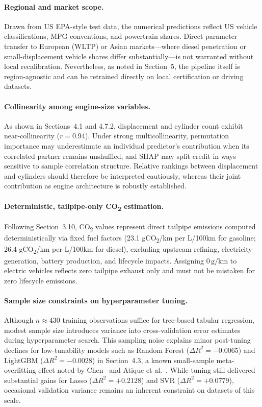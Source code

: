 \paragraph{Regional and market scope.}
Drawn from US EPA-style test data, the numerical predictions reflect US vehicle classifications, MPG conventions, and powertrain shares. Direct parameter transfer to European (WLTP) or Asian markets---where diesel penetration or small-displacement vehicle shares differ substantially---is not warranted without local recalibration. Nevertheless, as noted in Section~5, the pipeline itself is region-agnostic and can be retrained directly on local certification or driving datasets.

\paragraph{Collinearity among engine-size variables.}
As shown in Sections~4.1 and 4.7.2, displacement and cylinder count exhibit near-collinearity (\(r = 0.94\)). Under strong multicollinearity, permutation importance may underestimate an individual predictor's contribution when its correlated partner remains unshuffled, and SHAP may split credit in ways sensitive to sample correlation structure. Relative rankings between displacement and cylinders should therefore be interpreted cautiously, whereas their joint contribution as engine architecture is robustly established.

\paragraph{Deterministic, tailpipe-only CO\textsubscript{2} estimation.}
Following Section~3.10, CO\textsubscript{2} values represent direct tailpipe emissions computed deterministically via fixed fuel factors (23.1 gCO\textsubscript{2}/km per L/100km for gasoline; 26.4 gCO\textsubscript{2}/km per L/100km for diesel), excluding upstream refining, electricity generation, battery production, and lifecycle impacts. Assigning \(0\,\text{g/km}\) to electric vehicles reflects zero tailpipe exhaust only and must not be mistaken for zero lifecycle emissions.

\paragraph{Sample size constraints on hyperparameter tuning.}
Although \(n \approx 430\) training observations suffice for tree-based tabular regression, modest sample size introduces variance into cross-validation error estimates during hyperparameter search. This sampling noise explains minor post-tuning declines for low-tunability models such as Random Forest (\(\Delta R^2 = -0.0065\)) and LightGBM (\(\Delta R^2 = -0.0028\)) in Section~4.3, a known small-sample meta-overfitting effect noted by Chen~\cite{chen2025need} and Atique et al.~\cite{atique2026explainable}. While tuning still delivered substantial gains for Lasso (\(\Delta R^2 = +0.2128\)) and SVR (\(\Delta R^2 = +0.0779\)), occasional validation variance remains an inherent constraint on datasets of this scale.


